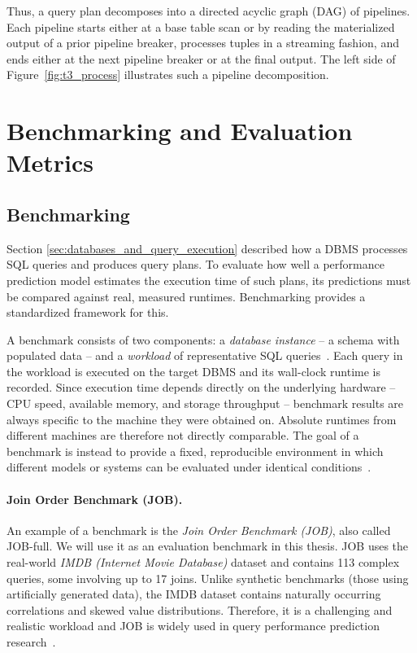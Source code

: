 Thus, a query plan decomposes into a directed acyclic graph (DAG) of pipelines.
Each pipeline starts either at a base table scan or by reading the materialized output of a prior pipeline breaker, processes tuples in a streaming fashion, and ends either at the next pipeline breaker or at the final output.
The left side of Figure~\ref{fig:t3_process} illustrates such a pipeline decomposition.
\section{Benchmarking and Evaluation Metrics}

\subsection{Benchmarking}

Section \ref{sec:databases_and_query_execution} described how a DBMS processes SQL queries and produces query plans.
To evaluate how well a performance prediction model estimates the execution time of such plans, its predictions must be compared against real, measured runtimes.
Benchmarking provides a standardized framework for this.

A benchmark consists of two components: a \emph{database instance} -- a schema with populated data -- and a \emph{workload} of representative SQL queries~\parencite{silberschatz2019}.
Each query in the workload is executed on the target DBMS and its wall-clock runtime is recorded.
Since execution time depends directly on the underlying hardware -- CPU speed, available memory, and storage throughput -- benchmark results are always specific to the machine they were obtained on.
Absolute runtimes from different machines are therefore not directly comparable.
The goal of a benchmark is instead to provide a fixed, reproducible environment in which different models or systems can be evaluated under identical conditions~\parencite{silberschatz2019}.

\paragraph{Join Order Benchmark (JOB).}
An example of a benchmark is the \textit{Join Order Benchmark (JOB)}, also called JOB-full. We will use it as an evaluation benchmark in this thesis.
JOB uses the real-world \textit{IMDB (Internet Movie Database)} dataset and contains 113 complex queries, some involving up to 17 joins.
Unlike synthetic benchmarks (those using artificially generated data), the IMDB dataset contains naturally occurring correlations and skewed value distributions.
Therefore, it is a challenging and realistic workload and JOB is widely used in query performance prediction research~\parencite{leis2018job}.

